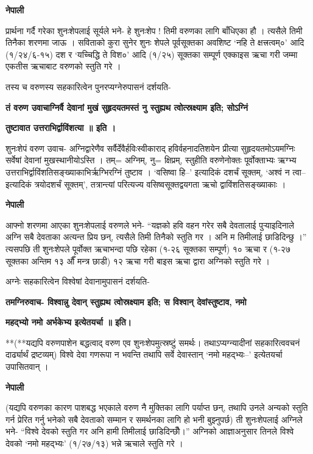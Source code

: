 \documentclass[11pt, a5paper]{article}
\begin{document}
\textbf{नेपाली}

प्रार्थना गर्दै गरेका शुनःशेपलाई सूर्यले भने- हे शुनःशेप ! तिमी वरुणका लागि बाँधिएका हौ । त्यसैले तिमी तिनैका शरणमा जाऊ । सविताको कुरा सुनेर शुनः शेपले पूर्वसूक्तका अवशिष्ट ‘नहि ते क्षत्त्रत्वम्०’ आदि (१/२४/६-१५) दश र ‘यच्चिद्धि ते विश०’ आदि (१/२५) सूक्तका सम्पूर्ण एक्काइस ऋचा गरी जम्मा एकतीस ऋचाबाट वरुणको स्तुति गरे ।

तस्य च वरुणस्य सहकारित्वेन पुनरप्यग्नेरुपासनं दर्शयति-

\textbf{तं वरुण उवाचाग्निर्वै देवानां मुखं सुहृदयतमस्तं नु स्तुह्यथ त्वोत्स्रक्ष्याम इति; सोऽग्निं}

\textbf{तुष्टावात उत्तराभिर्द्वाविंशत्या ॥ इति ।}

शुनःशेपं वरुण उवाच-  अग्निद्वारेणैव सर्वैर्देवैर्हविःस्वीकाराद् हविर्वहनादतिशयेन प्रीत्या सुहृदयतमोऽयमग्निः सर्वेषां देवानां मुखस्थानीयोऽस्ति । तम्= अग्निम्, नु= क्षिप्रम्, स्तुहीति वरुणेनोक्तः पूर्वोक्ताभ्यः ऋग्भ्य उत्तराभिर्द्वाविंशतिसङ्‍ख्याकाभिर्ऋग्भिरग्निं तुष्टाव । ‘वसिष्वा हि--’ इत्यादिकं दशर्चं सूक्तम्, ‘अश्वं न त्वा-- इत्यादिकं त्रयोदशर्चं सूक्तम्’, तत्रान्त्यां परित्यज्य वसिष्वसूक्तद्वयगता ऋचो द्वाविंशतिसङ्‌ख्याकाः ।

\textbf{नेपाली}

आफ्नो शरणमा आएका शुनःशेपलाई वरुणले भने- “यज्ञको हवि वहन गरेर सबै देवतालाई पुर्‍याइदिनाले अग्नि सबै देवताका अत्यन्त प्रिय छन्, त्यसैले तिमी तिनैको स्तुति गर । अनि म तिमीलाई छाडिदिन्छु ।” त्यसपछि ती शुनःशेपले पूर्वोक्त ऋचाभन्दा पछि रहेका (१-२६ सूक्तका सम्पूर्ण)  १० ऋचा र (१-२७ सूक्तका अन्तिम १३ औँ मन्त्र छाडी) १२  ऋचा गरी बाइस ऋचा द्वारा अग्निको स्तुति गरे ।

अग्नेः सहकारित्वेन विश्वेषां देवानामुपासनं दर्शयति-

\textbf{तमग्निरुवाच- विश्वान्नु देवान् स्तुह्यथ त्वोस्रक्ष्याम इति; स विश्वान् देवांस्तुष्टाव, नमो}

\textbf{महद्भ्यो नमो अर्भकेभ्य इत्येतयर्चा ॥ इति।}

**(**यद्यपि वरुणपाशेन बद्धत्वाद् वरुण एव शुनःशेपमुत्स्रष्टुं समर्थः। तथाऽप्यग्न्यादीनां सहकारित्ववचनं दार्ढ्यार्थं द्रष्टव्यम्) विश्वे देवा गणरूपा न भवन्ति तथापि सर्वे देवास्तान् ‘नमो महद्भ्यः--’ इत्येतयर्चा उपासितवान् ।

\textbf{नेपाली}

(यद्यपि वरुणका कारण पाशबद्ध भएकाले वरुण नै मुक्तिका लागि पर्याप्त छन्, तथापि उनले अन्यको स्तुति गर्न प्रेरित गर्नु भनेको सबै देवताको सम्मान र समर्थनका लागि हो भनी बुझ्नुपर्छ) ती शुनःशेपलाई अग्निले भने- “विश्वे देवको स्तुति गर अनि हामी तिमीलाई छाडिदिन्छौँ।” अग्निको आज्ञाअनुसार तिनले विश्वे देवको ‘नमो महद्भ्यः’ (१/२७/१३) भन्ने ऋचाले स्तुति गरे ।
\end{document}

